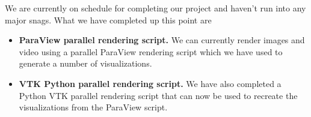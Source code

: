 We are currently on schedule for completing our project and haven't run into any major snags. What we have completed up this point are

\begin{itemize}
	\item \textbf{ParaView parallel rendering script.} We can currently render images and video using a parallel ParaView rendering script which we have used to generate a number of visualizations. 
	\item \textbf{VTK Python parallel rendering script.} We have also completed a Python VTK parallel rendering script that can now be used to recreate the visualizations from the ParaView script.
\end{itemize}